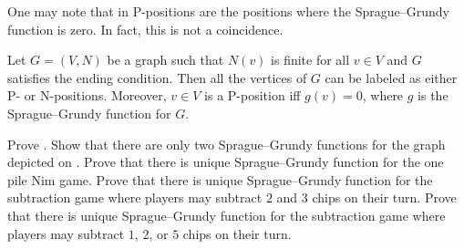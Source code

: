One may note that in  P-positions are the positions
where the Sprague--Grundy function is zero. In fact, this is not a coincidence.
\begin{theorem}
\label{theorem:grundy-to-np}
  Let $G = (V, N)$ be a graph such that $N(v)$ is finite for all $v \in V$ and 
  $G$ satisfies the ending condition. Then all the vertices of $G$ can be
  labeled as either P- or N-positions. Moreover, $v \in V$ is a P-position iff
  $g(v) = 0$, where $g$ is the Sprague--Grundy function for $G$.
\end{theorem}


\begin{chapterendexercises}
    \exercise Prove .
    \exercise Show that there are only two Sprague--Grundy functions for the
    graph depicted on .
    \exercise Prove that there is unique Sprague--Grundy function for the one pile
        Nim game.
    \exercise Prove that there is unique Sprague--Grundy function for the
        subtraction game where players may subtract $2$ and $3$ chips on their
        turn.
    \exercise
       Prove that there is unique Sprague--Grundy function for the subtraction
       game where players may subtract $1$, $2$, or $5$ chips
       on their turn.
\end{chapterendexercises}

